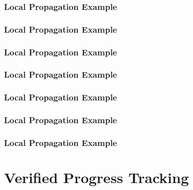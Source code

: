 \documentclass[aspectratio=169,10pt]{beamer}
\begin{document}
\begin{frame}
  \frametitle{Local Propagation Example}
  \begin{center}
    
  \end{center}
\end{frame}

\begin{frame}
  \frametitle{Local Propagation Example}
  \begin{center}
    
  \end{center}
\end{frame}

\begin{frame}
  \frametitle{Local Propagation Example}
  \begin{center}
    
  \end{center}
\end{frame}

\begin{frame}
  \frametitle{Local Propagation Example}
  \begin{center}
    
  \end{center}
\end{frame}

\begin{frame}
  \frametitle{Local Propagation Example}
  \begin{center}
    
  \end{center}
\end{frame}

\begin{frame}
  \frametitle{Local Propagation Example}
  \begin{center}
    
  \end{center}
\end{frame}

\begin{frame}
  \frametitle{Local Propagation Example}
  \begin{center}
    
  \end{center}
\end{frame}

\section{Verified Progress Tracking}
\end{document}
